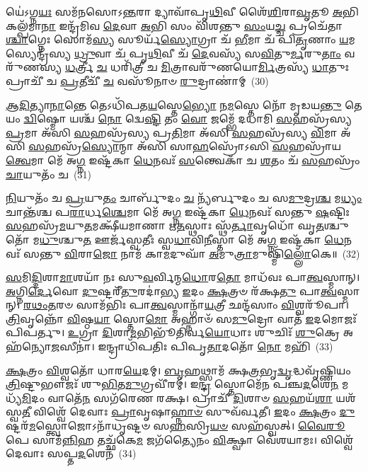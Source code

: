 𑌯𑍇॑\-𑌽𑌗𑍍𑌨\-\ul{𑌯𑌃} 𑌸𑌮᳴𑌨𑌸𑍋\-𑌽\-\ul{𑌨𑍍𑌤}\-𑌰𑌾 𑌦𑍍𑌯𑌾𑌵𑌾᳴𑌪𑍃\-\ul{𑌥𑌿}\-𑌵𑍀 𑌶𑍈᳴\-\ul{𑌶𑌿}\-𑌰𑌾\-\ul{𑌵𑍃}\-𑌤𑍂 \ul{𑌅}\-𑌭𑌿 𑌕𑌲𑍍𑌪᳴𑌮𑌾\-\ul{𑌨𑌾} 𑌇𑌨𑍍𑌦𑍍𑌰᳴𑌮𑌿𑌵 \ul{𑌦𑍇}\-𑌵𑌾 \ul{𑌅}\-𑌭𑌿 𑌸𑌂 𑌵𑌿᳴𑌶𑌨𑍍𑌤𑍁 \ul{𑌸𑌂}\-𑌯\-\ul{𑌚𑍍𑌚} 𑌪𑍍𑌰𑌚𑍇᳴𑌤𑌾\-\ul{𑌶𑍍𑌚𑌾}\-𑌗𑍍𑌨𑍇𑌃 𑌸𑍋𑌮᳴\-\ul{𑌸𑍍𑌯} 𑌸𑍂𑌰𑍍𑌯᳴\-\ul{𑌸𑍍𑌯𑍋}\-𑌗𑍍𑌰𑌾 𑌚᳴ \ul{𑌭𑍀}\-𑌮𑌾 𑌚᳴ 𑌪𑌿\-\ul{𑌤𑍃}\-𑌣𑌾𑌂 \ul{𑌯}\-𑌮𑌸𑍍𑌯𑍇𑌨𑍍𑌦𑍍𑌰᳴𑌸𑍍𑌯 \ul{𑌧𑍍𑌰𑍁}\-𑌵𑌾 𑌚᳴ 𑌪𑍃\-\ul{𑌥𑌿}\-𑌵𑍀 𑌚᳴ \ul{𑌦𑍇}\-𑌵𑌸𑍍𑌯᳴ 𑌸\-\ul{𑌵𑌿}\-𑌤𑍁\-\ul{𑌰𑍍𑌮}\-𑌰𑍁\-\ul{𑌤𑌾𑌂} 𑌵𑌰𑍁᳴𑌣𑌸𑍍𑌯 \ul{𑌧}\-𑌰𑍍𑌤𑍍𑌰𑍀 \ul{𑌚} 𑌧𑌰𑌿᳴𑌤𑍍𑌰𑍀 𑌚 \ul{𑌮𑌿}\-𑌤𑍍𑌰𑌾𑌵𑌰𑍁᳴𑌣𑌯𑍋\-\ul{𑌰𑍍𑌮𑌿}\-𑌤𑍍𑌰𑌸𑍍𑌯᳴ \ul{𑌧𑌾}\-𑌤𑍁𑌃 𑌪𑍍𑌰𑌾𑌚𑍀᳴ 𑌚 \ul{𑌪𑍍𑌰}\-𑌤𑍀𑌚𑍀᳴ \ul{𑌚} 𑌵𑌸𑍂᳴𑌨𑌾𑍞 \ul{𑌰𑍁}\-𑌦𑍍𑌰𑌾𑌣𑌾॑𑌮𑍍~(30)

\-\ul{𑌆}\-\-\ul{𑌦𑌿}\-𑌤𑍍𑌯𑌾\-\ul{𑌨𑌾}\-𑌨𑍍𑌤𑍇 𑌤𑍇\-𑌽𑌧𑌿᳴𑌪𑌤\-\ul{𑌯}\-𑌸𑍍𑌤𑍇\-\ul{𑌭𑍍𑌯𑍋} 𑌨\-\ul{𑌮}\-𑌸𑍍𑌤𑍇 𑌨𑍋᳴ 𑌮𑍃𑌡𑌯\-\ul{𑌨𑍍𑌤𑍁} 𑌤𑍇 𑌯𑌂 \ul{𑌦𑍍𑌵𑌿}\-𑌷𑍍𑌮𑍋 𑌯𑌶𑍍𑌚᳴ \ul{𑌨𑍋} 𑌦𑍍𑌵𑍇\-\ul{𑌷𑍍𑌟𑌿} 𑌤𑌂 \ul{𑌵𑍋} 𑌜𑌮𑍍𑌭𑍇᳴ 𑌦𑌧𑌾𑌮𑌿 \ul{𑌸}\-𑌹𑌸𑍍𑌰᳴𑌸𑍍𑌯 \ul{𑌪𑍍𑌰}\-𑌮𑌾 𑌅᳴𑌸𑌿 \ul{𑌸}\-𑌹𑌸𑍍𑌰᳴𑌸𑍍𑌯 𑌪𑍍𑌰\-\ul{𑌤𑌿}\-𑌮𑌾 𑌅᳴𑌸𑌿 \ul{𑌸}\-𑌹𑌸𑍍𑌰᳴𑌸𑍍𑌯 \ul{𑌵𑌿}\-𑌮𑌾 𑌅᳴𑌸𑌿 \ul{𑌸}\-𑌹𑌸𑍍𑌰᳴\-\ul{𑌸𑍍𑌯𑍋}\-𑌨𑍍𑌮𑌾 𑌅᳴𑌸𑌿 𑌸𑌾\-\ul{𑌹}\-𑌸𑍍𑌰𑍋᳴\-𑌽𑌸𑌿 \ul{𑌸}\-𑌹𑌸𑍍𑌰𑌾᳴𑌯 \ul{𑌤𑍍𑌵𑍇}\-𑌮𑌾 𑌮𑍇᳴ 𑌅\-\ul{𑌗𑍍𑌨} 𑌇𑌷𑍍𑌟᳴𑌕𑌾 \ul{𑌧𑍇}\-𑌨𑌵𑌃᳴ \ul{𑌸}\-𑌨𑍍𑌤𑍍𑌵𑍇𑌕𑌾᳴ 𑌚 \ul{𑌶}\-𑌤𑌂 𑌚᳴ \ul{𑌸}\-𑌹𑌸𑍍𑌰𑌂᳴ \ul{𑌚𑌾}\-𑌯𑍁𑌤𑌂᳴ 𑌚~(31)

\-\ul{𑌨𑌿}\-𑌯𑍁𑌤𑌂᳴ 𑌚 \ul{𑌪𑍍𑌰}\-𑌯𑍁\-\ul{𑌤𑌂} 𑌚𑌾𑌰𑍍𑌬𑍁᳴𑌦𑌂 \ul{𑌚} 𑌨𑍍𑌯᳴𑌰𑍍𑌬𑍁𑌦𑌂 𑌚 𑌸\-\ul{𑌮𑍁}\-𑌦𑍍𑌰\-\ul{𑌶𑍍𑌚} 𑌮\-\ul{𑌧𑍍𑌯𑌂} 𑌚𑌾𑌨𑍍𑌤᳴𑌶𑍍𑌚 𑌪\-\ul{𑌰𑌾}\-𑌰𑍍𑌧\-\ul{𑌶𑍍𑌚𑍇}\-𑌮𑌾 𑌮𑍇᳴ 𑌅\-\ul{𑌗𑍍𑌨} 𑌇𑌷𑍍𑌟᳴𑌕𑌾 \ul{𑌧𑍇}\-𑌨𑌵𑌃᳴ 𑌸𑌨𑍍𑌤𑍁 \ul{𑌷}\-𑌷𑍍𑌟𑌿𑌃 \ul{𑌸}\-𑌹𑌸𑍍𑌰᳴\-\ul{𑌮}\-𑌯𑍁\-\ul{𑌤}\-𑌮𑌕𑍍𑌷𑍀᳴𑌯𑌮𑌾𑌣𑌾 𑌋\-\ul{𑌤}\-𑌸𑍍𑌥𑌾𑌃 𑌸𑍍𑌥᳴\-\ul{𑌰𑍍𑌤𑌾}\-𑌵𑍃𑌧𑍋᳴ 𑌘𑍃\-\ul{𑌤}\-𑌶𑍍𑌚𑍁𑌤𑍋᳴ 𑌮\-\ul{𑌧𑍁}\-𑌶𑍍𑌚𑍁\-\ul{𑌤} 𑌊𑌰𑍍𑌜᳴𑌸𑍍𑌵𑌤𑍀𑌃 𑌸𑍍𑌵\-\ul{𑌧𑌾}\-𑌵𑌿\-\ul{𑌨𑍀}\-𑌸𑍍𑌤𑌾 𑌮𑍇᳴ 𑌅\-\ul{𑌗𑍍𑌨} 𑌇𑌷𑍍𑌟᳴𑌕𑌾 \ul{𑌧𑍇}\-𑌨𑌵𑌃᳴ 𑌸𑌨𑍍𑌤𑍁 \ul{𑌵𑌿}\-𑌰𑌾\-\ul{𑌜𑍋} 𑌨𑌾𑌮᳴ 𑌕𑌾\-\ul{𑌮}\-𑌦𑍁𑌘𑌾᳴ \ul{𑌅}\-𑌮𑍁\-\ul{𑌤𑍍𑌰𑌾}\-𑌮𑍁𑌷𑍍𑌮𑌿᳴\-\ul{𑌲𑍍𑌲𑍋𑌁}\-𑌕𑍇॥~(32)

{\anuvakamend[{𑌸𑌵𑍍𑌰᳴𑌤𑌾 \ul{𑌰𑍁}\-𑌦𑍍𑌰𑌾𑌣𑌾᳴\-\ul{𑌮}\-𑌯𑍁𑌤𑌂᳴ \ul{𑌚} 𑌪𑌞𑍍𑌚᳴𑌚𑌤𑍍𑌵𑌾𑌰𑌿𑍞𑌶𑌚𑍍𑌚}]}%

\-\ul{𑌸}\-𑌮𑌿\-\ul{𑌦𑍍𑌦𑌿}\-𑌶𑌾\-\ul{𑌮𑌾}\-𑌶𑌯𑌾᳴ 𑌨𑌃 𑌸𑍁\-\ul{𑌵}\-𑌰𑍍𑌵𑌿𑌨𑍍𑌮\-\ul{𑌧𑍋}\-𑌰\-\ul{𑌤𑍋} 𑌮𑌾𑌧᳴𑌵𑌃 𑌪𑌾\-\ul{𑌤𑍍𑌵}\-𑌸𑍍𑌮𑌾𑌨𑍍। \ul{𑌅}\-𑌗𑍍𑌨𑌿\-\ul{𑌰𑍍𑌦𑍇}\-𑌵𑍋 \ul{𑌦𑍁}\-𑌷𑍍𑌟𑌰𑍀᳴\-\ul{𑌤𑍁}\-𑌰𑌦𑌾॑𑌭𑍍𑌯 \ul{𑌇}\-𑌦𑌂 \ul{𑌕𑍍𑌷}\-𑌤𑍍𑌰𑍞 𑌰᳴𑌕𑍍𑌷\-\ul{𑌤𑍁} 𑌪𑌾\-\ul{𑌤𑍍𑌵}\-𑌸𑍍𑌮𑌾𑌨𑍍। \ul{𑌰}\-\-\ul{𑌥𑌂}\-\-\ul{𑌤}\-𑌰𑍞 𑌸𑌾𑌮᳴𑌭𑌿𑌃 𑌪𑌾\-\ul{𑌤𑍍𑌵}\-𑌸𑍍𑌮𑌾𑌨𑍍𑌗𑌾᳴\-\ul{𑌯}\-𑌤𑍍𑌰𑍀 𑌛𑌨𑍍𑌦᳴𑌸𑌾𑌂 \ul{𑌵𑌿}\-𑌶𑍍𑌵𑌰𑍂᳴𑌪𑌾। \ul{𑌤𑍍𑌰𑌿}\-𑌵𑍃𑌨𑍍𑌨𑍋᳴ \ul{𑌵𑌿}\-𑌷𑍍𑌠\-\ul{𑌯𑌾} 𑌸𑍍𑌤𑍋\-\ul{𑌮𑍋} 𑌅𑌹𑍍𑌨𑌾𑍞᳴ 𑌸\-\ul{𑌮𑍁}\-𑌦𑍍𑌰𑍋 𑌵𑌾𑌤᳴ \ul{𑌇}\-𑌦𑌮𑍋𑌜𑌃᳴ 𑌪𑌿𑌪𑌰𑍍𑌤𑍁। \ul{𑌉}\-𑌗𑍍𑌰𑌾 \ul{𑌦𑌿}\-𑌶𑌾\-\ul{𑌮}\-𑌭𑌿𑌭𑍂᳴𑌤𑌿𑌰𑍍𑌵\-\ul{𑌯𑍋}\-𑌧𑌾𑌃 𑌶𑍁𑌚𑌿𑌃᳴ \ul{𑌶𑍁}\-𑌕𑍍𑌰𑍇 𑌅𑌹᳴𑌨𑍍𑌯𑍋\-\ul{𑌜}\-𑌸𑍀𑌨𑌾॑। 𑌇𑌨𑍍𑌦𑍍𑌰𑌾𑌧𑌿᳴𑌪𑌤𑌿𑌃 𑌪𑌿𑌪𑍃\-\ul{𑌤𑌾}\-𑌦𑌤𑍋᳴ \ul{𑌨𑍋} 𑌮𑌹𑌿᳴~(33)

\-\ul{𑌕𑍍𑌷}\-𑌤𑍍𑌰𑌂 \ul{𑌵𑌿}\-𑌶𑍍𑌵𑌤𑍋᳴ 𑌧𑌾𑌰\-\ul{𑌯𑍇}\-𑌦𑌮𑍍। \ul{𑌬𑍃}\-𑌹𑌥𑍍𑌸𑌾𑌮᳴ 𑌕𑍍𑌷\-\ul{𑌤𑍍𑌰}\-𑌭𑍃\-\ul{𑌦𑍍𑌵𑍃}\-𑌦𑍍𑌧𑌵𑍃᳴𑌷𑍍𑌣𑌿𑌯𑌂 \ul{𑌤𑍍𑌰𑌿}\-𑌷𑍍𑌟𑍁𑌭𑍗𑌜𑌃᳴ 𑌶𑍁\-\ul{𑌭𑌿}\-𑌤\-\ul{𑌮𑍁}\-𑌗𑍍𑌰𑌵𑍀᳴𑌰𑌮𑍍। 𑌇\-\ul{𑌨𑍍𑌦𑍍𑌰} 𑌸𑍍𑌤𑍋𑌮𑍇᳴𑌨 𑌪𑌞𑍍𑌚\-\ul{𑌦}\-𑌶𑍇\-\ul{𑌨} 𑌮𑌧𑍍𑌯᳴\-\ul{𑌮𑌿}\-𑌦𑌂 𑌵𑌾𑌤𑍇᳴\-\ul{𑌨} 𑌸𑌗᳴𑌰𑍇𑌣 𑌰𑌕𑍍𑌷। 𑌪𑍍𑌰𑌾𑌚𑍀᳴ \ul{𑌦𑌿}\-𑌶𑌾𑍞 \ul{𑌸}\-𑌹𑌯᳴\-\ul{𑌶𑌾} 𑌯𑌶᳴𑌸𑍍𑌵\-\ul{𑌤𑍀} 𑌵𑌿𑌶𑍍𑌵𑍇᳴ 𑌦𑍇𑌵𑌾𑌃 \ul{𑌪𑍍𑌰𑌾}\-𑌵𑍃𑌷𑌾\-\ul{𑌹𑍍𑌨𑌾}\-\-\ul{𑍞} 𑌸𑍁𑌵᳴𑌰𑍍𑌵𑌤𑍀। \ul{𑌇}\-𑌦𑌂 \ul{𑌕𑍍𑌷}\-𑌤𑍍𑌰𑌂 \ul{𑌦𑍁}\-𑌷𑍍𑌟𑌰᳴\-\ul{𑌮}\-𑌸𑍍𑌤𑍍𑌵𑍋𑌜𑍋\-𑌽𑌨𑌾᳴𑌧𑍃𑌷𑍍𑌟𑍞 𑌸\-\ul{𑌹}\-𑌸𑍍𑌰𑌿\-\ul{𑌯}\-\-\ul{𑍞} 𑌸𑌹᳴𑌸𑍍𑌵𑌤𑍍। \ul{𑌵𑍈}\-\-\ul{𑌰𑍂}\-𑌪𑍇 𑌸𑌾𑌮᳴\-\ul{𑌨𑍍𑌨𑌿}\-𑌹 𑌤𑌚𑍍𑌛᳴𑌕𑍇\-\ul{𑌮} 𑌜𑌗᳴𑌤𑍍𑌯𑍈𑌨𑌂 \ul{𑌵𑌿}\-𑌕𑍍𑌷𑍍𑌵𑌾 𑌵𑍇᳴𑌶𑌯𑌾𑌮𑌃। 𑌵𑌿𑌶𑍍𑌵𑍇᳴ 𑌦𑍇𑌵𑌾𑌃 𑌸𑌪𑍍𑌤\-\ul{𑌦}\-𑌶𑍇𑌨᳴~(34)

